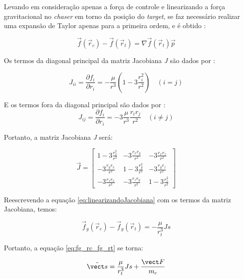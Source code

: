 Levando em consideração apenas a força de controle e linearizando a força gravitacional no \emph{chaser} em torno da posição do \emph{target}, se faz necessário realizar uma expansão de Taylor apenas para a primeira ordem, e é obtido \cite{arantes2011}:

\begin{equation}
\label{eq:linearizandoJacobiana}
\vec f(\vec r_c) - \vec f(\vec r_t) = \nabla \vec f(\vec r_t)\vec p
\end{equation}

Os termos da diagonal principal da matriz Jacobiana \emph{J} são dados por \cite{fehse2003}:

\begin{equation}
\label{eq:jacobianaDiagonal}
J_{ii} = \frac{\partial f_i}{\partial r_i} = -\frac{\mu}{r^3} \left(1 - 3\frac{r_i^2}{r^2}\right) \quad (i = j)
\end{equation}

E os termos fora da diagonal principal são dados por \cite{fehse2003}:
\begin{equation}
\label{eq:jacobianaForaDiagonal}
J_{ij} = \frac{\partial f_i}{\partial r_i} = -3 \frac{\mu}{r^3} \frac{r_i r_j}{r^2} \quad (i \neq j)
\end{equation}

Portanto, a matriz Jacobiana \emph{J} será:

\begin{equation}
    \label{eq:jacobianaGenerica}
\vec J = 
\begin{bmatrix}
1 - 3\frac{r_x^2}{r^2} &  -3\frac{r_x r_y}{r^2} &  -3\frac{r_x r_z}{r^2} \\
-3\frac{r_y r_x}{r^2} & 1 - 3\frac{r_y^2}{r^2} & -3\frac{r_y r_z}{r^2} \\
-3\frac{r_z r_x}{r^2} & -3\frac{r_z r_y}{r^2} & 1 - 3\frac{r_z^2}{r^2}
\end{bmatrix}
\end{equation}

Reescrevendo a equação \eqref{eq:linearizandoJacobiana} com os termos da matriz Jacobiana, temos:

\begin{equation}
\label{eq:linearizandoJacobiana2}
\vec f_g(\vec r_c) - \vec f_g(\vec r_t) = -\frac{\mu}{r_t^3} Js
\end{equation}

Portanto, a equação \eqref{eq:fg_rc_fg_rt} se torna:

\begin{equation}
\label{eq:fg_rc_fg_rt_linearizada}  
\ddot{\vect s} = \frac{\mu}{r_t^3} Js + \frac{\vect F}{m_c}
\end{equation}

